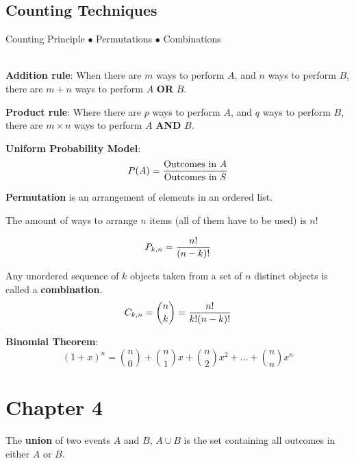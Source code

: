 \documentclass[english, 12pt]{article}
\begin{document}
\subsection{Counting Techniques}
Counting Principle $\bullet$ Permutations $\bullet$ Combinations\\\\

\begin{defn}
\textbf{Addition rule}: When there are $m$ ways to perform $A$, and $n$ ways to perform $B$, there are $m+n$ ways to perform $A$ \textbf{OR} $B$.
\end{defn}

\begin{defn}
\textbf{Product rule}: Where there are $p$ ways to perform $A$, and $q$ ways to perform $B$, there are $m \times n$ ways to perform $A$ \textbf{AND} $B$.
\end{defn}

\begin{defn}
\textbf{Uniform Probability Model}:
\[P(A) = \frac{\text{Outcomes in } A}{\text{Outcomes in } S} \]
\end{defn}

\begin{defn}
\textbf{Permutation} is an arrangement of elements in an ordered list.
\begin{note}
The amount of ways to arrange $n$ items (all of them have to be used) is $n!$
\end{note}
\[P_{k,n} = \frac{n!}{(n-k)!}\]
\end{defn}

\begin{defn}
Any unordered sequence of $k$ objects taken from a set of $n$ distinct objects is called a \textbf{combination}.
\[C_{k,n} = {n \choose k} = \frac{n!}{k! (n-k)!}\]
\end{defn}

\begin{exmp}
\textbf{Binomial Theorem}:
\[(1+x)^n = {n \choose 0} + {n \choose 1} x + {n \choose 2} x^2 + \dots + {n \choose n} x^n\]
\end{exmp}

\section{Chapter 4}

\begin{defn}
The \textbf{union} of two events $A$ and $B$, $A \cup B$ is the set containing all outcomes in either $A$ or $B$.
\end{defn}
\end{document}
